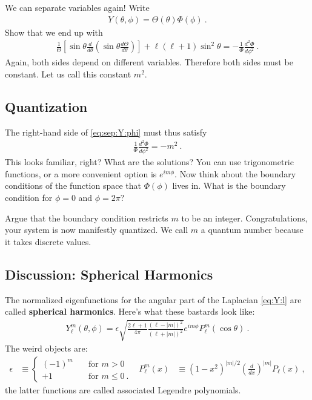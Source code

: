 \documentclass[12pt]{article}
\numberwithin{equation}{section}    %
\begin{document}
We can separate variables again! Write
\begin{align}
	Y(\theta,\phi)=\Theta(\theta)\Phi(\phi) \ .
\end{align}
Show that we end up with
\begin{align}
	\frac{1}{\Theta}
	\left[
	\sin\theta \frac{d}{d\theta}
	\left(\sin\theta \frac{d\Theta}{d\theta}\right)
	\right]
	+ \ell(\ell+1)\sin^2\theta
	= - \frac{1}{\Phi}\frac{d^2\Phi}{d\phi^2} \ .
	\label{eq:sep:Y:phi}
\end{align}
Again, both sides depend on different variables. Therefore both sides must be constant. Let us call this constant $m^2$. 

\subsection{Quantization}

The right-hand side of \eqref{eq:sep:Y:phi} must thus satisfy
\begin{align}
	\frac{1}{\Phi}\frac{d^2\Phi}{d\phi^2} = -m^2 \ .
\end{align}
This looks familiar, right? What are the solutions? You can use trigonometric functions, or a more convenient option is $e^{im\phi}$. Now think about the boundary conditions of the function space that $\Phi(\phi)$ lives in. What is the boundary condition for $\phi=0$ and $\phi=2\pi$? 

Argue that the boundary condition restricts $m$ to be an integer. Congratulations, your system is now manifestly quantized. We call $m$ a quantum number because it takes discrete values.


\subsection*{Discussion: Spherical Harmonics}

The normalized eigenfunctions for the angular part of the Laplacian \eqref{eq:Y:l} are called \textbf{spherical harmonics}. Here's what these bastards look like:
\begin{align}
	Y_\ell^m(\theta,\phi)=
	\epsilon
	\sqrt{\frac{2\ell+1}{4\pi} \frac{(\ell-|m|)^2}{(\ell+|m|)^2}}
	e^{im\phi}
	P_\ell^m(\cos\theta) \ .
\end{align}
The weird objects are:
\begin{align}
	\epsilon &\equiv 
	\begin{cases}
	(-1)^m &\quad\text{for }m> 0\\
	+1&\quad\text{for }m \leq 0  \ .
	\end{cases}
	&
	P_\ell^m(x) 
	&\equiv(1-x^2)^{|m|/2}
	\left(\frac{d}{dx}\right)^{|m|}P_\ell(x) \ ,
\end{align}
the latter functions are called associated Legendre polynomials. 
\end{document}
